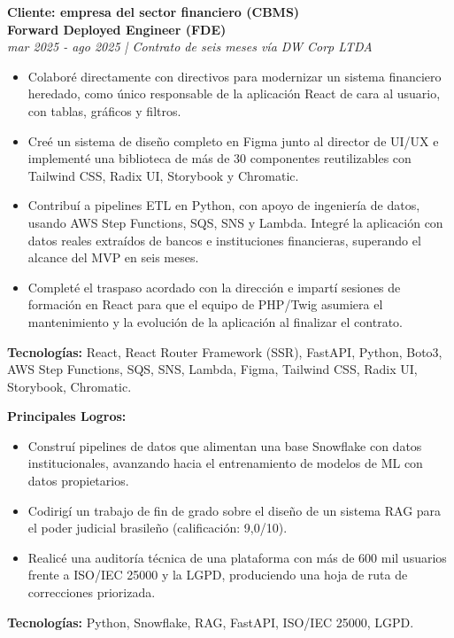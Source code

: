 \documentclass[10pt,a4paper]{altacv}
\begin{document}
\textbf{Cliente: empresa del sector financiero (CBMS)}\\
\textbf{Forward Deployed Engineer (FDE)}\\
\textit{mar 2025 - ago 2025 | Contrato de seis meses vía DW Corp LTDA}
\begin{itemize}
\setlength{\itemindent}{0.5em}
\item[--] Colaboré directamente con directivos para modernizar un sistema financiero heredado, como único responsable de la aplicación React de cara al usuario, con tablas, gráficos y filtros.
\item[--] Creé un sistema de diseño completo en Figma junto al director de UI/UX e implementé una biblioteca de más de 30 componentes reutilizables con Tailwind CSS, Radix UI, Storybook y Chromatic.
\item[--] Contribuí a pipelines ETL en Python, con apoyo de ingeniería de datos, usando AWS Step Functions, SQS, SNS y Lambda. Integré la aplicación con datos reales extraídos de bancos e instituciones financieras, superando el alcance del MVP en seis meses.
\item[--] Completé el traspaso acordado con la dirección e impartí sesiones de formación en React para que el equipo de PHP/Twig asumiera el mantenimiento y la evolución de la aplicación al finalizar el contrato.
\end{itemize}
\textbf{Tecnologías:} React, React Router Framework (SSR), FastAPI, Python, Boto3, AWS Step Functions, SQS, SNS, Lambda, Figma, Tailwind CSS, Radix UI, Storybook, Chromatic.
\vspace{4mm}


\textbf{Principales Logros:}
\begin{itemize}
\setlength{\itemindent}{0.5em}
\item[--] Construí pipelines de datos que alimentan una base Snowflake con datos institucionales, avanzando hacia el entrenamiento de modelos de ML con datos propietarios.
\item[--] Codirigí un trabajo de fin de grado sobre el diseño de un sistema RAG para el poder judicial brasileño (calificación: 9,0/10).
\item[--] Realicé una auditoría técnica de una plataforma con más de 600 mil usuarios frente a ISO/IEC 25000 y la LGPD, produciendo una hoja de ruta de correcciones priorizada.
\end{itemize}
\textbf{Tecnologías:} Python, Snowflake, RAG, FastAPI, ISO/IEC 25000, LGPD.
\vspace{4mm}
\end{document}
